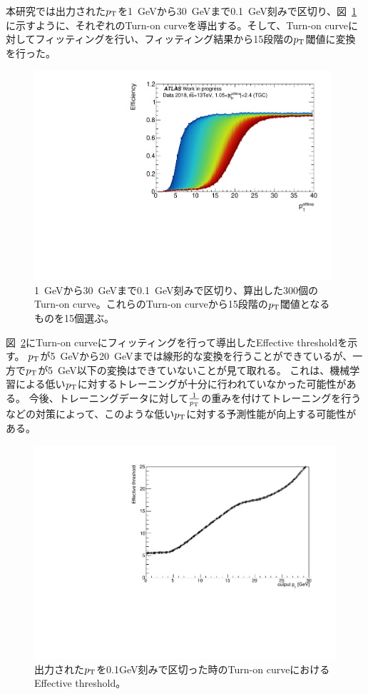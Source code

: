 本研究では出力された$p_{\rm{T}}$を1~GeVから30~GeVまで0.1~GeV刻みで区切り、図~\ref{fig:ALL_Turn-on}に示すように、それぞれのTurn-on curveを導出する。そして、Turn-on curveに対してフィッティングを行い、フィッティング結果から15段階の$p_{\rm{T}}$閾値に変換を行った。
\begin{figure}[htb]
  \centering
  \includegraphics[clip, width=11cm]{fig/4/ALLthr_v06_Data.pdf}
  \caption{1~GeVから30~GeVまで0.1~GeV刻みで区切り、算出した300個のTurn-on curve。これらのTurn-on curveから15段階の$p_{\rm{T}}$閾値となるものを15個選ぶ。}
  \label{fig:ALL_Turn-on}
\end{figure}
図~\ref{fig:Effictive_thr_v1}にTurn-on curveにフィッティングを行って導出したEffective thresholdを示す。
$p_{\rm{T}}$が5~GeVから20~GeVまでは線形的な変換を行うことができているが、一方で$p_{\rm{T}}$が5~GeV以下の変換はできていないことが見て取れる。
これは、機械学習による低い$p_{\rm{T}}$に対するトレーニングが十分に行われていなかった可能性がある。
今後、トレーニングデータに対して$\frac{1}{p_{\rm{T}}}$の重みを付けてトレーニングを行うなどの対策によって、このような低い$p_{\rm{T}}$に対する予測性能が向上する可能性がある。

\begin{figure}[tb]
  \centering
  \includegraphics[clip, width=12cm]{fig/4/Effictive_thr_v1.pdf}
  \caption{出力された$p_{\rm{T}}$を0.1GeV刻みで区切った時のTurn-on curveにおけるEffective threshold。}
  \label{fig:Effictive_thr_v1}
\end{figure}

